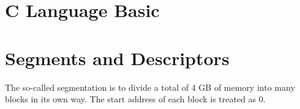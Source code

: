 \documentclass{swfcthesis}
\begin{document}









\section{C Language Basic}

\section{Segments and Descriptors}
The so-called segmentation is to divide a total of 4 GB of memory into many blocks in its
own way. The start address of each block is treated as 0.
\end{document}
